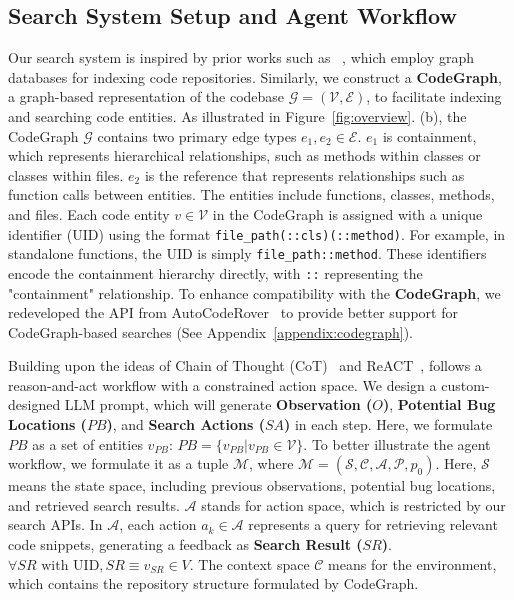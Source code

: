 
\subsection{Search System Setup and Agent Workflow}
\label{sec:search}
Our search system is inspired by prior works such as ~\cite{ma2024understand, ouyang2024repograph}, which employ graph databases for indexing code repositories. Similarly, we construct a \textbf{CodeGraph}, a graph-based representation of the codebase $\mathcal{G}=\mathcal{(V,E)}$, to facilitate indexing and searching code entities. As illustrated in Figure~\ref{fig:overview}. (b), the CodeGraph $\mathcal{G}$ contains two primary edge types $e_1, e_2 \in \mathcal{E}$. $e_1$ is containment, which represents hierarchical relationships, such as methods within classes or classes within files. $e_2$ is the reference that represents relationships such as function calls between entities. The entities include functions, classes, methods, and files. Each code entity $v\in \mathcal{V}$ in the CodeGraph is assigned with a unique identifier (UID) using the format \texttt{file\_path(::cls)(::method)}. For example, in standalone functions, the UID is simply \texttt{file\_path::method}. These identifiers encode the containment hierarchy directly, with \texttt{::} representing the "containment" relationship. To enhance compatibility with the \textbf{CodeGraph}, we redeveloped the API from AutoCodeRover~\cite{autocoderover} to provide better support for CodeGraph-based searches (See Appendix~\ref{appendix:codegraph}).


Building upon the ideas of Chain of Thought (CoT)~\cite{wei2022chain} and ReACT~\cite{yao2022react}, \nickname follows a reason-and-act workflow with a constrained action space. We design a custom-designed LLM prompt, which will generate \textbf{Observation ($O$)}, \textbf{Potential Bug Locations ($PB$)}, and \textbf{Search Actions ($SA$)} in each step. Here, we formulate $PB$ as a set of entities $v_{PB}$: $PB=\{v_{PB}|v_{PB}\in \mathcal{V}\}$.
To better illustrate the agent workflow, we formulate it as a tuple $\mathcal{M}$, where $\mathcal{M}=(\mathcal{S,C,A,P}, p_0)$. Here, $\mathcal{S}$ means the state space, including previous observations, potential bug locations, and retrieved search results. $\mathcal{A}$ stands for action space, which is restricted by our search APIs. In $\mathcal{A}$, each action $a_k \in \mathcal{A}$ represents a query for retrieving relevant code snippets, generating a feedback as \textbf{Search Result ($SR$)}. $\forall SR \text{ with UID}, SR \equiv v_{SR} \in V.$ The context space $\mathcal{C}$ means for the environment, which contains the repository structure formulated by CodeGraph.

